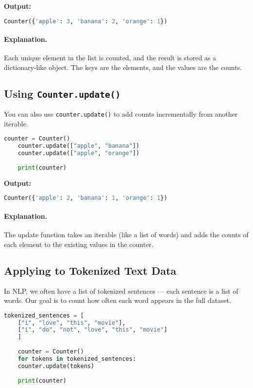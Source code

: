 \textbf{Output:}
\begin{lstlisting}[language=Python]
	Counter({'apple': 3, 'banana': 2, 'orange': 1})
\end{lstlisting}

\paragraph{Explanation.}
Each unique element in the list is counted, and the result is stored as a dictionary-like object. The keys are the elements, and the values are the counts.

\subsection{Using \texttt{Counter.update()}}

You can also use \texttt{counter.update()} to add counts incrementally from another iterable.

\begin{lstlisting}[language=Python, caption={Updating a Counter with more data}]
	counter = Counter()
	counter.update(["apple", "banana"])
	counter.update(["apple", "orange"])
	
	print(counter)
\end{lstlisting}

\textbf{Output:}
\begin{lstlisting}[language=Python]
	Counter({'apple': 2, 'banana': 1, 'orange': 1})
\end{lstlisting}

\paragraph{Explanation.}
The update function takes an iterable (like a list of words) and adds the counts of each element to the existing values in the counter.

\subsection{Applying to Tokenized Text Data}

In NLP, we often have a list of tokenized sentences — each sentence is a list of words. Our goal is to count how often each word appears in the full dataset.

\begin{lstlisting}[language=Python, caption={Counting word frequencies across multiple sentences}]
	tokenized_sentences = [
	["i", "love", "this", "movie"],
	["i", "do", "not", "love", "this", "movie"]
	]
	
	counter = Counter()
	for tokens in tokenized_sentences:
	counter.update(tokens)
	
	print(counter)
\end{lstlisting}

